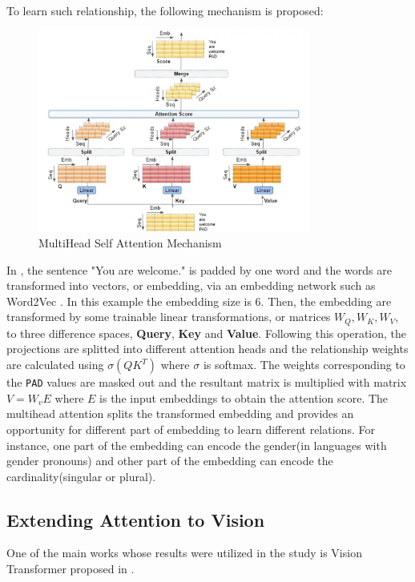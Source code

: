 \documentclass{IEEEtran}
\begin{document}
\vfill\null\newpage
To learn such relationship, the following mechanism is proposed: 
\begin{figure}[h]
\centering
\includegraphics[width=0.8\textwidth]{img/attmech.png}
\caption{MultiHead Self Attention Mechanism}\label{fig:attmech}
\end{figure}

In , the sentence "You are welcome." is padded by one word and the words are transformed into vectors, or embedding, via an embedding network such as Word2Vec \cite{mikolov2013efficient}. In this example the embedding size is 6. Then, the embedding are transformed by some trainable linear transformations, or matrices $W_Q, W_K, W_V$, to three difference spaces, \textbf{Query}, \textbf{Key} and \textbf{Value}. Following this operation, the projections are splitted into different attention heads and the relationship weights are calculated using $\sigma(QK^T)$ where $\sigma$ is softmax. The weights corresponding to the \texttt{PAD} values are masked out and the resultant matrix is multiplied with matrix $V = W_vE$ where $E$ is the input embeddings to obtain the attention score. The multihead attention splits the transformed embedding and provides an opportunity for different part of embedding to learn different relations. For instance, one part of the embedding can encode the gender(in languages with gender pronouns) and other part of the embedding can encode the cardinality(singular or plural). 


\subsection{Extending Attention to Vision} \label{sec:vit}
One of the main works whose results were utilized in the study is Vision Transformer proposed in \cite{dosovitskiy2020image}.
\end{document}
